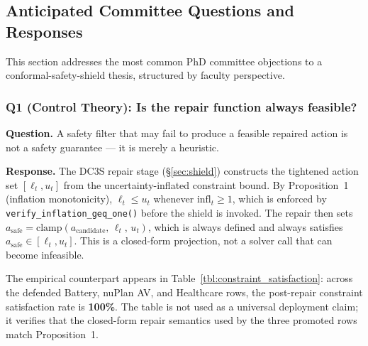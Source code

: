 
\subsection{Anticipated Committee Questions and Responses}
\label{sec:committee_response}

This section addresses the most common PhD committee objections to a
conformal-safety-shield thesis, structured by faculty perspective.







\subsubsection*{Q1 (Control Theory): Is the repair function always feasible?}

\textbf{Question.} A safety filter that may fail to produce a feasible repaired
action is not a safety guarantee — it is merely a heuristic.

\textbf{Response.}
The DC3S repair stage (\S\ref{sec:shield}) constructs the tightened action set
$[\ell_t, u_t]$ from the uncertainty-inflated constraint bound.  By
Proposition~1 (inflation monotonicity), $\ell_t \leq u_t$ whenever
$\text{infl}_t \geq 1$, which is enforced by \texttt{verify\_inflation\_geq\_one()}
before the shield is invoked.  The repair then sets
$a_\text{safe} = \text{clamp}(a_\text{candidate},\, \ell_t,\, u_t)$,
which is always defined and always satisfies $a_\text{safe} \in [\ell_t, u_t]$.
This is a closed-form projection, not a solver call that can become infeasible.

The empirical counterpart appears in Table~\ref{tbl:constraint_satisfaction}:
across the defended Battery, nuPlan AV, and Healthcare rows, the post-repair
constraint satisfaction rate is \textbf{100\%}.  The table is not used as a
universal deployment claim; it verifies that the closed-form repair semantics
used by the three promoted rows match Proposition~1.

